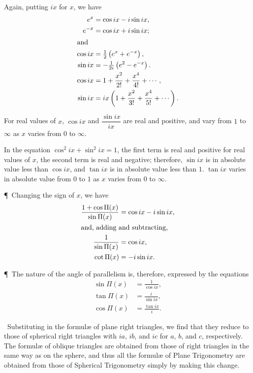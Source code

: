 \begin{description}
{\par Again, putting $ix$ for $x$, we have
\begin{align*}
  e^x &= \cos ix - i\sin ix,\\
  e^{-x} &= \cos ix + i\sin ix;\\
  \intertext{and}
  \cos ix &= \tfrac{1}{2} \left(e^x + e^{-x}\right),\\
  \sin ix &= -\tfrac{1}{2i} \left(e^2 - e^{-x}\right).\\
  \cos ix &= 1 + \frac{x^2}{2!} + \frac{x^4}{4!} + \dotsb,\\
  \sin ix &= ix \left(1 + \frac{x^2}{3!} + \frac{x^4}{5!}
                                                     + \dotsb\right).
\end{align*}
\par For real values of $x$, $\cos ix$ and $\dfrac{\sin ix}{ix}$ are
real and positive, and vary from $1$ to $\infty$ as $x$ varies from
$0$ to $\infty$.
\par In the equation $\cos^2ix + \sin^2ix = 1$, the first term is real
and positive for real values of $x$, the second term is real and
negative; therefore, $\sin ix$ is in absolute value less than $\cos
ix$, and $\tan ix$ is in absolute value less than $1$. $\tan ix$
varies in absolute value from $0$ to $1$ as $x$ varies from $0$ to
$\infty$.}

\P~Changing the sign of $x$, we have
\begin{align*}
\frac{1+\cos\Pi(x)}{\sin\Pi(x)} &= \cos ix - i \sin ix, \\
\intertext{and, adding and subtracting,}
\frac{1}{\sin\Pi(x)} &= \cos ix, \\
\cot\Pi(x) &= -i\sin ix.
\end{align*}

\P~The nature of the angle of parallelism is, therefore, expressed
by the equations
\begin{align*}
\sin\Pi(x) &= \frac{1}{\cos ix}, \\
\tan\Pi(x) &= \frac{i}{\sin ix}, \\
\cos\Pi(x) &= \frac{\tan ix}{i}.
\end{align*}

\item[4.]~Substituting in the formulæ of plane right triangles, we
find that they reduce to those of spherical right triangles with
$ia$, $ib$, and $ic$ for $a$, $b$, and $c$, respectively. The
formulæ of oblique triangles are obtained from those of right
triangles in the same way as on the sphere, and thus all the formulæ
of Plane Trigonometry are obtained from those of Spherical
Trigonometry simply by making this change.


\end{description}
